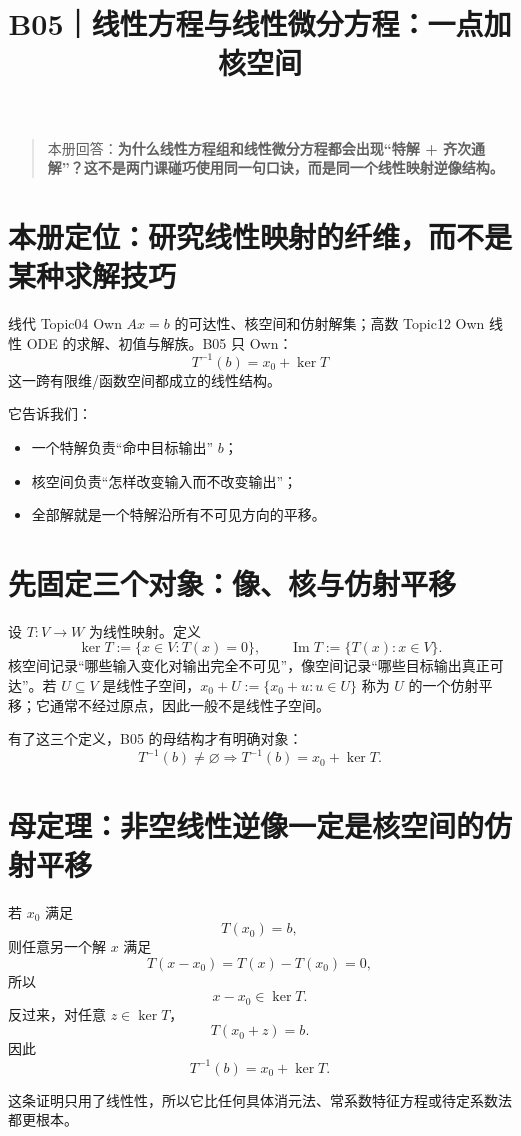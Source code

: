 \documentclass[profile=standard]{ipara-handbook}
\title{B05｜线性方程与线性微分方程：一点加核空间}
\author{}
\date{}
\begin{document}
\maketitle

\begin{quote}
本册回答：\textbf{为什么线性方程组和线性微分方程都会出现“特解 + 齐次通解”？这不是两门课碰巧使用同一句口诀，而是同一个线性映射逆像结构。}
\end{quote}

\section{本册定位：研究线性映射的纤维，而不是某种求解技巧}
线代 Topic04 Own $Ax=b$ 的可达性、核空间和仿射解集；高数 Topic12 Own 线性 ODE 的求解、初值与解族。B05 只 Own：
\[
\boxed{T^{-1}(b)=x_0+\ker T}
\]
这一跨有限维/函数空间都成立的线性结构。

它告诉我们：
\begin{itemize}
\item 一个特解负责“命中目标输出” $b$；
\item 核空间负责“怎样改变输入而不改变输出”；
\item 全部解就是一个特解沿所有不可见方向的平移。
\end{itemize}

\section{先固定三个对象：像、核与仿射平移}
设 $T:V\to W$ 为线性映射。定义
\[
\ker T:=\{x\in V:T(x)=0\},
\qquad
\operatorname{Im}T:=\{T(x):x\in V\}.
\]
核空间记录“哪些输入变化对输出完全不可见”，像空间记录“哪些目标输出真正可达”。若 $U\subseteq V$ 是线性子空间，$x_0+U:=\{x_0+u:u\in U\}$ 称为 $U$ 的一个仿射平移；它通常不经过原点，因此一般不是线性子空间。

有了这三个定义，B05 的母结构才有明确对象：
\[
\boxed{T^{-1}(b)\neq\varnothing\Longrightarrow T^{-1}(b)=x_0+\ker T.}
\]

\section{母定理：非空线性逆像一定是核空间的仿射平移}
若 $x_0$ 满足
\[
T(x_0)=b,
\]
则任意另一个解 $x$ 满足
\[
T(x-x_0)=T(x)-T(x_0)=0,
\]
所以
\[
x-x_0\in\ker T.
\]
反过来，对任意 $z\in\ker T$，
\[
T(x_0+z)=b.
\]
因此
\[
\boxed{T^{-1}(b)=x_0+\ker T.}
\]

这条证明只用了线性性，所以它比任何具体消元法、常系数特征方程或待定系数法都更根本。
\end{document}
